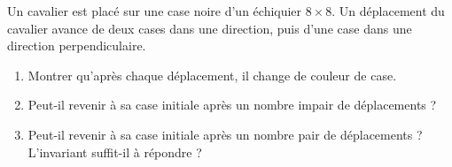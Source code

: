 Un cavalier est placé sur une case noire d'un échiquier $8 \times 8$. Un déplacement du cavalier avance de deux
cases dans une direction, puis d'une case dans une direction perpendiculaire.
\begin{enumerate}
  \item Montrer qu'après chaque déplacement, il change de couleur de case.
  \item Peut-il revenir à sa case initiale après un nombre impair de
  déplacements ?
  \item Peut-il revenir à sa case initiale après un nombre pair de
  déplacements ? L'invariant suffit-il à répondre ?
\end{enumerate}
